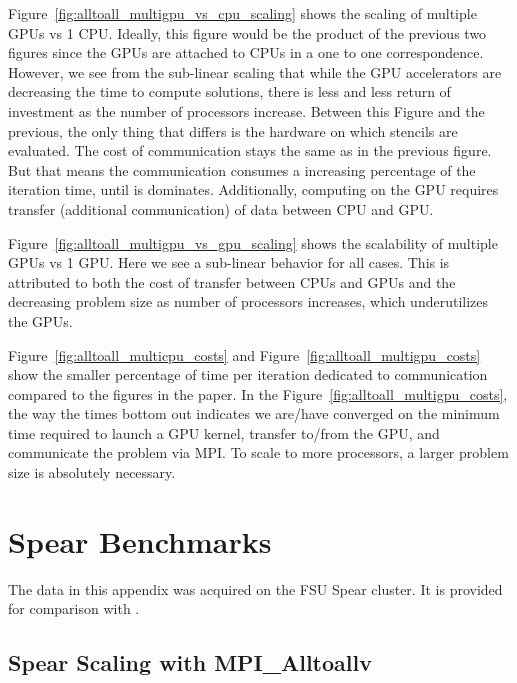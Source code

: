 Figure~\ref{fig:alltoall_multigpu_vs_cpu_scaling}  shows the scaling of multiple GPUs vs 1 CPU. Ideally, this figure would be the product of the previous two figures since the GPUs are attached to CPUs in a one to one correspondence. However, we see from the sub-linear scaling that while the GPU accelerators are decreasing the time to compute solutions, there is less and less return of investment as the number of processors increase. Between this Figure and the previous, the only thing that differs is the hardware on which stencils are evaluated. The cost of communication stays the same as in the previous figure. But that means the communication consumes a increasing percentage of the iteration time, until is dominates. 
Additionally, computing on the GPU requires transfer (additional communication) of data between CPU and GPU. 

Figure~\ref{fig:alltoall_multigpu_vs_gpu_scaling} shows the scalability of multiple GPUs vs 1 GPU. Here we see a sub-linear behavior for all cases. This is attributed to both the cost of transfer between CPUs and GPUs and the decreasing problem size as number of processors increases, which underutilizes the GPUs. 


Figure~\ref{fig:alltoall_multicpu_costs} and Figure~\ref{fig:alltoall_multigpu_costs} show the smaller percentage of time per iteration dedicated to communication compared to the figures in the paper. In the Figure~\ref{fig:alltoall_multigpu_costs}, the way the times bottom out indicates we are/have converged on the minimum time required to launch a GPU kernel, transfer to/from the GPU, and communicate the problem via MPI. To scale to more processors, a larger problem size is absolutely necessary.



\chapter{Spear Benchmarks} 
\label{app:spear_alltoallv_benchmarks}

The data in this appendix was acquired on the FSU Spear cluster. It is provided for comparison with \cite{BolligFlyerErlebacher2012}.

\section{Spear Scaling with MPI\_Alltoallv}


